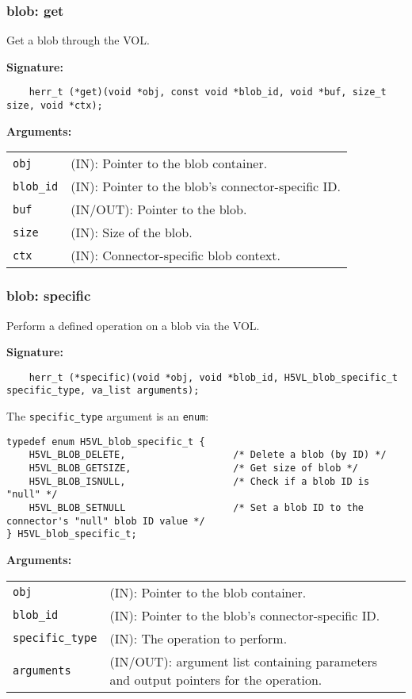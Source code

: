 \subsubsection{blob: get}
Get a blob through the VOL.

\begin{mdframed}[style=bgbox]
\textbf{Signature:}
\begin{lstlisting}
    herr_t (*get)(void *obj, const void *blob_id, void *buf, size_t size, void *ctx);
\end{lstlisting}

\textbf{Arguments:}\\
\begin{tabular}{l p{13.5cm}}
  \texttt{obj} & (IN): Pointer to the blob container.\\
  \texttt{blob\_id} & (IN): Pointer to the blob's connector-specific ID.\\
  \texttt{buf} & (IN/OUT): Pointer to the blob.\\
  \texttt{size} & (IN): Size of the blob.\\
  \texttt{ctx} & (IN): Connector-specific blob context.\\
\end{tabular}
\end{mdframed}

\subsubsection{blob: specific}
Perform a defined operation on a blob via the VOL.

\begin{mdframed}[style=bgbox]
\textbf{Signature:}
\begin{lstlisting}
    herr_t (*specific)(void *obj, void *blob_id, H5VL_blob_specific_t specific_type, va_list arguments);
\end{lstlisting}

The \texttt{specific\_type} argument is an \texttt{enum}:
\begin{lstlisting}
typedef enum H5VL_blob_specific_t {
    H5VL_BLOB_DELETE,                   /* Delete a blob (by ID) */
    H5VL_BLOB_GETSIZE,                  /* Get size of blob */
    H5VL_BLOB_ISNULL,                   /* Check if a blob ID is "null" */ 
    H5VL_BLOB_SETNULL                   /* Set a blob ID to the connector's "null" blob ID value */
} H5VL_blob_specific_t;
\end{lstlisting}

\textbf{Arguments:}\\
\begin{tabular}{l p{13.5cm}}
  \texttt{obj} & (IN): Pointer to the blob container.\\
  \texttt{blob\_id} & (IN): Pointer to the blob's connector-specific ID.\\
  \texttt{specific\_type} & (IN): The operation to perform.\\
  \texttt{arguments} & (IN/OUT): argument list containing parameters and output pointers for the operation. \\
\end{tabular}
\end{mdframed}

